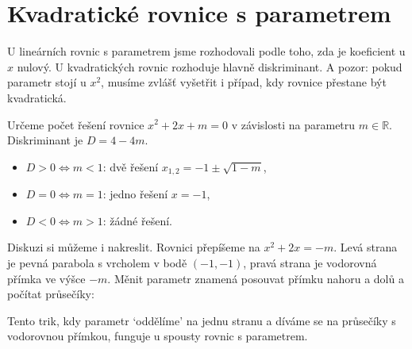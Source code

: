 \section{Kvadratické rovnice s parametrem}\label{sec:kvadr-parametr}

U lineárních rovnic s parametrem jsme rozhodovali podle toho, zda je koeficient u $x$ nulový. U kvadratických rovnic rozhoduje hlavně diskriminant. A pozor: pokud parametr stojí u $x^2$, musíme zvlášť vyšetřit i případ, kdy rovnice přestane být kvadratická.

\begin{example}
  Určeme počet řešení rovnice $x^2 + 2x + m = 0$ v závislosti na parametru $m\in\mathbb{R}$. Diskriminant je $D = 4 - 4m$.
  \begin{itemize}
    \item $D > 0\Leftrightarrow m < 1$: dvě řešení $x_{1,2} = -1\pm\sqrt{1 - m}$,
    \item $D = 0\Leftrightarrow m = 1$: jedno řešení $x = -1$,
    \item $D < 0\Leftrightarrow m > 1$: žádné řešení.
  \end{itemize}
\end{example}

Diskuzi si můžeme i nakreslit. Rovnici přepíšeme na $x^2 + 2x = -m$. Levá strana je pevná parabola s vrcholem v bodě $(-1, -1)$, pravá strana je vodorovná přímka ve výšce $-m$. Měnit parametr znamená posouvat přímku nahoru a dolů a počítat průsečíky:
\begin{center}
\end{center}
Tento trik, kdy parametr `oddělíme' na jednu stranu a díváme se na průsečíky s vodorovnou přímkou, funguje u spousty rovnic s parametrem.

